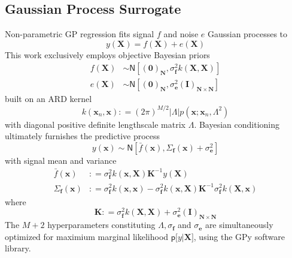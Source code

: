 \documentclass[preprint,12pt]{elsarticle}
\newcommand*{\M}[1]{\ensuremath{#1}\xspace}
\newcommand*{\vr}[1]{\M{\mathbf{#1}}}
\newcommand*{\deq}{\M{\mathrel{\mathop:}=}}
\newcommand*{\gauss}[2]{\mathsf{N}\!\left\lbrack{} #1 , #2 \right\rbrack}
\newcommand*{\modulus}[1]{\M{\left\lvert#1\right\rvert}}
\begin{document}
        \subsection{Gaussian Process Surrogate} \label{sub:Method:GP}
            Non-parametric GP regression fits signal $f$ and noise $e$ Gaussian processes to
            \begin{equation} \label{eq:Method:GP:Problem}
                y(\vr{X}) = f(\vr{X}) + e(\vr{X})
            \end{equation}
            This work exclusively employs objective Bayesian priors
            \begin{align*}
                f(\vr{X}) &\sim \gauss{(\vr{0})_{\vr{N}}}{\sigma_{\vr{f}}^{2} k(\vr{X},\vr{X})} \\
                e(\vr{X}) &\sim \gauss{(\vr{0})_{\vr{N}}}{\sigma_{\vr{e}}^{2} (\vr{I})_{\vr{N}\times\vr{N}}} 
            \end{align*}
            built on an ARD kernel \cite{Wipf.Nagarajan2007, Neal1996}
            \begin{equation} \label{eq:Method:GP:Kernel}
                k(\vr{x}_{n},\vr{x}) \deq 
                (2 \pi)^{M/2} \modulus{\Lambda} p\!\left(\vr{x} ; \vr{x}_{n}, \Lambda^2\right) 
            \end{equation}
            with diagonal positive definite lengthscale matrix \(\Lambda\).
            Bayesian conditioning ultimately furnishes the predictive process
            \begin{equation*}
                y(\vr{x}) \sim \gauss{\bar{f}(\vr{x})}{\Sigma_{\vr{f}}(\vr{x}) + \sigma_{\vr{e}}^{2}}
            \end{equation*}
            with signal mean and variance
            \begin{equation} \label{eq:Method:GP:MeanAndVariance}
                \begin{aligned}
                    \bar{f}(\vr{x}) &\deq \sigma^{2}_\vr{f} k(\vr{x},\vr{X})
                    \vr{K}^{-1} y(\vr{X}) \\
                    \Sigma_{\vr{f}}(\vr{x}) &\deq \sigma^{2}_\vr{f} k(\vr{x},\vr{x})
                    - \sigma^{2}_\vr{f} k(\vr{x},\vr{X})
                    \vr{K}^{-1} \sigma^{2}_\vr{f} k(\vr{X},\vr{x})
                \end{aligned}
            \end{equation}
        where
            \begin{equation} \label{eq:Method:GP:KDef}
                \vr{K} \deq \sigma^{2}_\vr{f} k(\vr{X},\vr{X}) + \sigma_{\vr{e}}^{2} (\vr{I})_{\vr{N}\times\vr{N}}       
            \end{equation}
        The $M+2$ hyperparameters constituting $\Lambda, \sigma_{\vr{f}}$ and $\sigma_{\vr{e}}$ are simultaneously optimized for maximium marginal likelihood $\mathsf{p}\lbrack y \vert \vr{X}\rbrack$, using the GPy software library.
\end{document}
